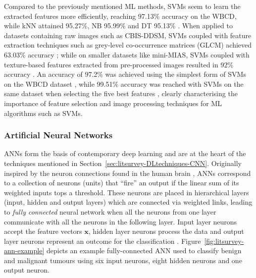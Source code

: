 Compared to the previously mentioned ML methods, SVMs seem to learn the extracted features more efficiently, reaching 97.13\% accuracy on the WBCD, while kNN attained 95.27\%, NB 95.99\% and DT 95.13\% \citep{Asri2016}. When applied to datasets containing raw images such as CBIS-DDSM, SVMs coupled with feature extraction techniques such as grey-level co-occurrence matrices (GLCM) achieved 63.03\% accuracy \citep{Sarosa2018}; while on smaller datasets like  mini-MIAS, SVMs coupled with texture-based features extracted from pre-processed images resulted in 92\% accuracy \citep{Vishrutha2014}. An accuracy of 97.2\% was achieved using the simplest form of SVMs on the WBCD dataset \citep{Bennett1998}, while 99.51\% accuracy was reached with SVMs on the same dataset when selecting the five best features \citep{Akay2009}, clearly characterising the importance of feature selection and image processing techniques for ML algorithms such as SVMs.

\subsubsection{Artificial Neural Networks}
\label{sec:litsurvey-anns}

ANNs form the basis of contemporary deep learning and are at the heart of the techniques mentioned in Section~\ref{sec:litsurvey-DLtechniques-CNN}. Originally inspired by the neuron connections found in the human brain \citep{mcculloch1943logical}, ANNs correspond to a collection of neurons (units) that ``fire'' an output if the linear sum of its weighted inputs tops a threshold. These neurons are placed in hierarchical layers (input, hidden and output layers) which are connected via weighted links, leading to \textit{fully connected} neural network when all the neurons from one layer communicate with all the neurons in the following layer. Input layer neurons accept the feature vectors $\textbf{x}$, hidden layer neurons process the data and output layer neurons represent an outcome for the classification \citep{russell2002artificial}. Figure~\ref{fig:litsurvey-ann-example} depicts an example fully-connected ANN used to classify benign and malignant tumours using six input neurons, eight hidden neurons and one output neuron.\\

